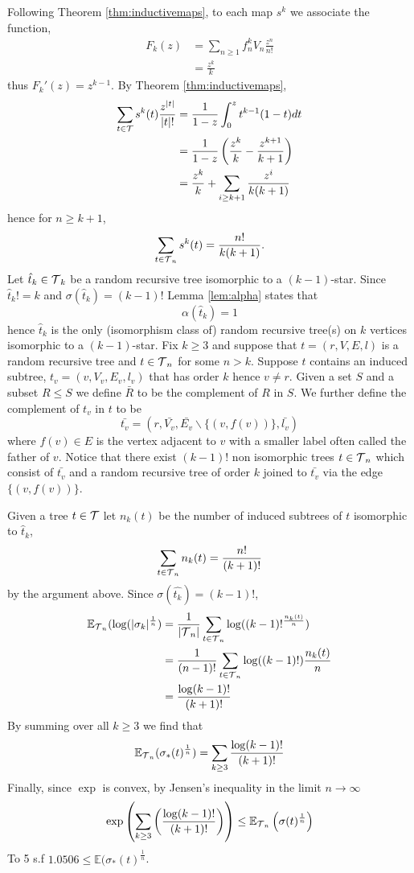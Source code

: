 Following Theorem \ref{thm:inductivemaps}, to each map $s^k$ we associate the function,
\begin{align}
 F_k(z) &= \sum_{n \geq 1} f_n^k V_n \frac{z^{n}}{n!} \\
 &= \frac{z^k}{k}
\end{align}
thus $F_k'(z) = z^{k-1}$.  By Theorem \ref{thm:inductivemaps},
\begin{align}
 \sum_{t \in \operatorname{\mathcal{T}}} s^k(t) \frac{z^{\lvert t \rvert}}{\lvert t \rvert !}  &= \frac{1}{1-z}\int_{0}^{z}t^{k-1}(1-t) dt \\
 &= \frac{1}{1-z}\left(\frac{z^k}{k} - \frac{z^{k+1}}{k+1} \right)  \\
 &= \frac{z^{k}}{k} + \sum_{i \geq k+1} \frac{z^i}{k(k+1)}
\end{align}
hence for $n \geq k+1$,
\[
 \sum_{t \in \operatorname{\mathcal{T}}_n} s^k(t) = \frac{n!}{k(k+1)}.
\]
Let $\hat{t}_k \in \operatorname{\mathcal{T}}_k$ be a random recursive tree isomorphic to a $(k-1)$-star.  Since $\hat{t}_k ! = k$ and 
$\sigma(\hat{t}_k) = (k-1)!$  Lemma \ref{lem:alpha} states that 
\[
 \alpha(\hat{t}_k) = 1
\]
hence $\hat{t}_k$ is the only (isomorphism class of) random recursive tree(s) on $k$ vertices isomorphic to a $(k-1)$-star. 
Fix $k \geq 3$ 
and suppose that $t = (r,V,E,l)$ is a random recursive tree and $t \in \operatorname{\mathcal{T}}_n$ for some $n >k$.  Suppose $t$ contains an induced 
subtree, $t_v = (v,V_v,E_v,l_v)$ that has order $k$ hence $v \neq r$.  Given a set $S$ and a subset $R \leq S$ we define $\bar{R}$ 
to be the complement of $R$ in $S$.  We further define the complement of $t_v$ in $t$ to be 
\[
\bar{t_v} = (r, \bar{V_v},\bar{E_v} \backslash\{(v,f(v))\},\bar{l_v})
\]
where $f(v) \in E$ is the vertex adjacent to $v$ with a smaller label often called the father of $v$.  Notice that there exist $(k-1)!$ non isomorphic trees $t \in \operatorname{\mathcal{T}}_n$ 
which consist of $\bar{t_v}$ and a random recursive tree of order $k$ joined to $\bar{t_v}$  via the edge $\{(v,f(v))\}$.

Given a tree $t \in \operatorname{\mathcal{T}}$ let $n_k(t)$ be the number of induced subtrees of $t$ isomorphic to $\hat{t}_k$,
\[
 \sum_{t \in \operatorname{\mathcal{T}}_n}n_k(t)  = \frac{n!}{(k+1)!}
\]
by the argument above.  Since $\sigma(\hat{t_k}) = (k-1)!$,
\begin{align}
 \mathbb{E}_{\operatorname{\mathcal{T}}_n}(\log(\lvert \sigma_k \rvert^{\frac{1}{n}}) &= \frac{1}{\lvert \operatorname{\mathcal{T}}_n \rvert}\sum_{t \in \operatorname{\mathcal{T}}_n} \log((k-1)!^{\frac{n_k(t)}{n}}) \\
 &= \frac{1}{(n-1)!}\sum_{t \in \operatorname{\mathcal{T}}_n} \log((k-1)!)\frac{n_k(t)}{n} \\
 &= \frac{\log(k-1)!}{(k+1)!}
\end{align}
By summing over all $k \geq 3$ we find that 
\[
\mathbb{E}_{\operatorname{\mathcal{T}}_n}(\sigma_*(t)^{\frac{1}{n}})  = 
 \sum_{k \geq 3} \frac{\log(k-1)!}{(k+1)!}
\]
Finally, since $\exp$ is convex,  by Jensen's inequality in the limit $n \rightarrow \infty$
\[
 \exp\left(\sum_{k \geq 3}\left( \frac{\log(k-1)!}{(k+1)!} \right)\right) \leq \mathbb{E}_{\operatorname{\mathcal{T}}_n}\left(\sigma(t)^{\frac{1}{n}}\right)
\]
To 5 s.f $1.0506 \leq \mathbb{E}(\sigma_*(t)^{\frac{1}{n}}$. 

